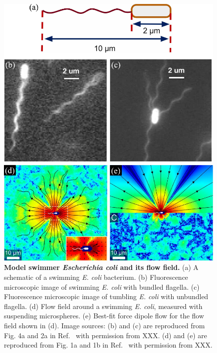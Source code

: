 \begin{figure}[!htbp]
	\begin{center}
	\includegraphics[width=5.5 in]{Figs/2-Exp/1.pdf}
	\end{center}
	\caption[Figure 2.1:]
	{
	\textbf{Model swimmer \textit{Escherichia coli} and its flow field.}
  (a) A schematic of a swimming \textit{E. coli} bacterium.
  (b) Fluorescence microscopic image of swimming \textit{E. coli} with bundled flagella.
  (c) Fluorescence microscopic image of tumbling \textit{E. coli} with unbundled flagella.
  (d) Flow field around a swimming \textit{E. coli}, measured with suspending microspheres.
  (e) Best-fit force dipole flow for the flow field shown in (d).
  Image sources:
  (b) and (c) are reproduced from Fig. 4a and 2a in Ref.~\cite{Turner2000} with permission from XXX.
  (d) and (e) are reproduced from Fig. 1a and 1b in Ref.~\cite{Drescher2011} with permission from XXX.
	}
	\label{fig:2-1}
\end{figure}





